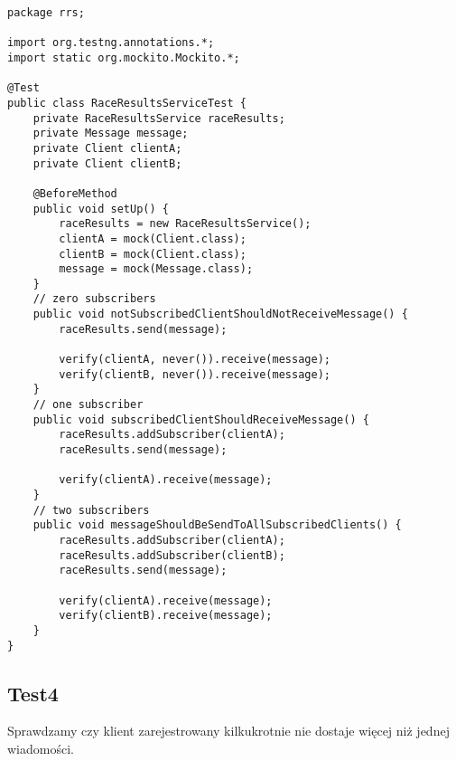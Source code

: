 \documentclass[a4paper,12pt,twoside]{article}
\begin{document}
\begin{lstlisting}
package rrs;

import org.testng.annotations.*;
import static org.mockito.Mockito.*;

@Test
public class RaceResultsServiceTest {
    private RaceResultsService raceResults;
    private Message message;
    private Client clientA;
    private Client clientB;
    
    @BeforeMethod
    public void setUp() {
        raceResults = new RaceResultsService();
        clientA = mock(Client.class);
        clientB = mock(Client.class);
        message = mock(Message.class);
    }
    // zero subscribers
    public void notSubscribedClientShouldNotReceiveMessage() {
        raceResults.send(message);
        
        verify(clientA, never()).receive(message);
        verify(clientB, never()).receive(message);
    }
    // one subscriber
    public void subscribedClientShouldReceiveMessage() {
        raceResults.addSubscriber(clientA);
        raceResults.send(message);
        
        verify(clientA).receive(message);
    }
    // two subscribers
    public void messageShouldBeSendToAllSubscribedClients() {
        raceResults.addSubscriber(clientA);
        raceResults.addSubscriber(clientB);
        raceResults.send(message);
        
        verify(clientA).receive(message);
        verify(clientB).receive(message);
    }
}
\end{lstlisting}

\subsection{Test4}

Sprawdzamy czy klient zarejestrowany kilkukrotnie nie dostaje więcej niż jednej wiadomości.
\end{document}
